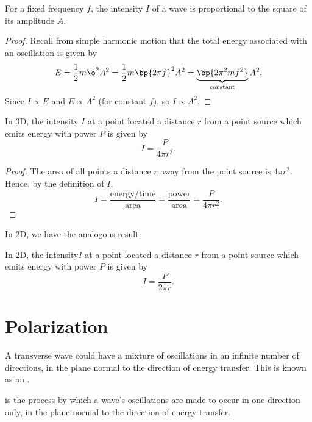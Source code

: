 \begin{proposition}
    For a fixed frequency $f$, the intensity $I$ of a wave is proportional to the square of its amplitude $A$.
\end{proposition}
\begin{proof}
    Recall from simple harmonic motion that the total energy associated with an oscillation is given by \[E = \frac12 m \o^2 A^2 = \frac12 m \bp{2\pi f}^2 A^2 = \underbrace{\bp{2\pi^2 m f^2}}_{\text{constant}} A^2.\] Since $I \propto E$ and $E \propto A^2$ (for constant $f$), so $I \propto A^2$.
\end{proof}

\begin{proposition}
    In 3D, the intensity $I$ at a point located a distance $r$ from a point source which emits energy with power $P$ is given by \[I = \frac{P}{4\pi r^2}.\]
\end{proposition}
\begin{proof}
    The area of all points a distance $r$ away from the point source is $4\pi r^2$. Hence, by the definition of $I$, \[I = \frac{\text{energy} / \text{time}}{\text{area}} = \frac{\text{power}}{\text{area}} = \frac{P}{4\pi r^2}.\]
\end{proof}

In 2D, we have the analogous result:

\begin{proposition}
    In 2D, the intensity\footnotemark $I$ at a point located a distance $r$ from a point source which emits energy with power $P$ is given by \[I = \frac{P}{2\pi r}.\]
\end{proposition}

\section{Polarization}

A transverse wave could have a mixture of oscillations in an infinite number of directions, in the plane normal to the direction of energy transfer. This is known as an .

\begin{definition}
     is the process by which a wave's oscillations are made to occur in one direction only, in the plane normal to the direction of energy transfer.
\end{definition}


